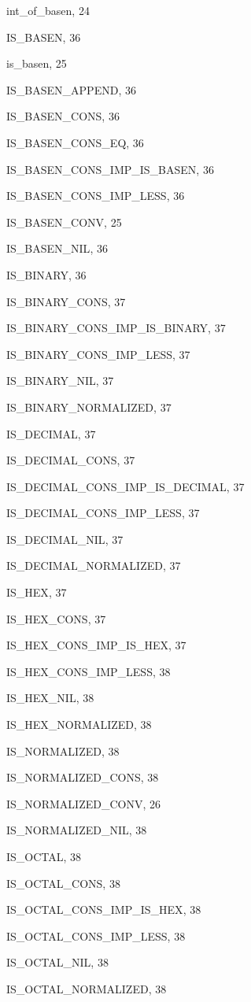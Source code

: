 \begin{theindex}
  \item {\ptt int\_of\_basen}, 24
  \item {\ptt IS\_BASEN}, 36
  \item {\ptt is\_basen}, 25
  \item {\ptt IS\_BASEN\_APPEND}, 36
  \item {\ptt IS\_BASEN\_CONS}, 36
  \item {\ptt IS\_BASEN\_CONS\_EQ}, 36
  \item {\ptt IS\_BASEN\_CONS\_IMP\_IS\_BASEN}, 36
  \item {\ptt IS\_BASEN\_CONS\_IMP\_LESS}, 36
  \item {\ptt IS\_BASEN\_CONV}, 25
  \item {\ptt IS\_BASEN\_NIL}, 36
  \item {\ptt IS\_BINARY}, 36
  \item {\ptt IS\_BINARY\_CONS}, 37
  \item {\ptt IS\_BINARY\_CONS\_IMP\_IS\_BINARY}, 37
  \item {\ptt IS\_BINARY\_CONS\_IMP\_LESS}, 37
  \item {\ptt IS\_BINARY\_NIL}, 37
  \item {\ptt IS\_BINARY\_NORMALIZED}, 37
  \item {\ptt IS\_DECIMAL}, 37
  \item {\ptt IS\_DECIMAL\_CONS}, 37
  \item {\ptt IS\_DECIMAL\_CONS\_IMP\_IS\_DECIMAL}, 37
  \item {\ptt IS\_DECIMAL\_CONS\_IMP\_LESS}, 37
  \item {\ptt IS\_DECIMAL\_NIL}, 37
  \item {\ptt IS\_DECIMAL\_NORMALIZED}, 37
  \item {\ptt IS\_HEX}, 37
  \item {\ptt IS\_HEX\_CONS}, 37
  \item {\ptt IS\_HEX\_CONS\_IMP\_IS\_HEX}, 37
  \item {\ptt IS\_HEX\_CONS\_IMP\_LESS}, 38
  \item {\ptt IS\_HEX\_NIL}, 38
  \item {\ptt IS\_HEX\_NORMALIZED}, 38
  \item {\ptt IS\_NORMALIZED}, 38
  \item {\ptt IS\_NORMALIZED\_CONS}, 38
  \item {\ptt IS\_NORMALIZED\_CONV}, 26
  \item {\ptt IS\_NORMALIZED\_NIL}, 38
  \item {\ptt IS\_OCTAL}, 38
  \item {\ptt IS\_OCTAL\_CONS}, 38
  \item {\ptt IS\_OCTAL\_CONS\_IMP\_IS\_HEX}, 38
  \item {\ptt IS\_OCTAL\_CONS\_IMP\_LESS}, 38
  \item {\ptt IS\_OCTAL\_NIL}, 38
  \item {\ptt IS\_OCTAL\_NORMALIZED}, 38


\end{theindex}
